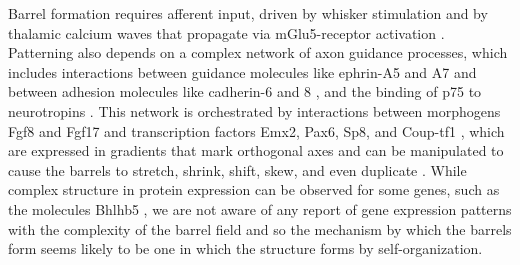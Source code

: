 \documentclass[9pt,twocolumn,twoside,lineno]{pnas-new}
\begin{document}
%

Barrel formation requires afferent input, driven by whisker stimulation and by
thalamic calcium waves that propagate via mGlu5-receptor activation
\citep{anton-bolanos_prenatal_2019}.
Patterning also depends on a complex network of axon guidance processes, which
includes interactions between guidance molecules like ephrin-A5 and A7
\citep{miller_epha7-ephrin-a5_2006} and between adhesion molecules like
cadherin-6 and 8 \citep{bishop_regulation_2000}, and the
binding of p75 to neurotropins
\citep{bishop_distinct_2002}.
%
This network is orchestrated by interactions between morphogens Fgf8 and Fgf17
and transcription factors Emx2, Pax6, Sp8, and Coup-tf1
\citep{shimogori_fibroblast_2005,bishop_regulation_2000}, which are expressed
in gradients that mark orthogonal axes and can be manipulated to cause the
barrels to stretch, shrink, shift, skew, and even duplicate \cite{assimacopoulos_fibroblast_2012}.
%
While complex structure in protein expression can be observed for some genes,
such as the molecules Bhlhb5 \citep{joshi_bhlhb5_2008}, we are not aware of
any report of gene expression patterns with the complexity of the barrel field
and so the mechanism by which the barrels form seems likely to be one in which
the structure forms by self-organization.
\end{document}
